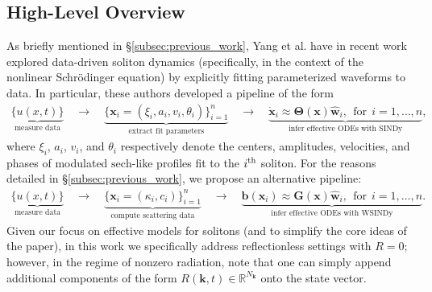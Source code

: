 \documentclass[journal=gmj]{CUP-JNL-DTM}%
\theoremstyle{definition}
\numberwithin{equation}{section}
\begin{document}
\subsection{High-Level Overview}\label{subsec:outline}
As briefly mentioned in \S\ref{subsec:previous_work}, Yang et al. have in recent work \cite{Yang.etal2025} explored data-driven soliton dynamics (specifically, in the context of the nonlinear Schr\"odinger equation) by explicitly fitting parameterized waveforms to data. In particular, these authors developed a pipeline of the form
\begin{align*}
    \underbrace{\big\{ u(x,t) \big\}}_{\text{measure data}}
    \quad \rightarrow \quad
    \underbrace{\big\{ \boldsymbol{x}_i = (\xi_i, a_i, v_i, \theta_i) \big\}_{i=1}^{n}}_{\text{extract fit parameters}}
    \quad \rightarrow \quad
    \underbrace{\dot{\boldsymbol{x}}_i \approx \mathbf{\Theta}(\boldsymbol{x}) \hat{\mathbf{w}}_i, \ \ \text{for} \ \ i = 1, \dots, n}_{\text{infer effective ODEs with SINDy}},
\end{align*} where $\xi_i$, $a_i$, $v_i$, and $\theta_i$ respectively denote the centers, amplitudes, velocities, and phases of modulated $\text{sech}$-like profiles fit to the $i^{\rm{th}}$ soliton. For the reasons detailed in \S\ref{subsec:previous_work}, we propose an alternative pipeline: \begin{align*}
    \underbrace{\big\{ u(x,t) \big\}}_{\text{measure data}}
    \quad \rightarrow \quad
    \underbrace{\big\{ \boldsymbol{x}_i = (\kappa_i, c_i) \big\}_{i=1}^{n}}_{\text{compute scattering data}}
    \quad \rightarrow \quad
    \underbrace{\mathbf{b}(\boldsymbol{x}_i) \approx \mathbf{G}(\boldsymbol{x}) \hat{\mathbf{w}}_i, \ \ \text{for} \ \ i = 1, \dots, n}_{\text{infer effective ODEs with WSINDy}}.
\end{align*} Given our focus on effective models for solitons (and to simplify the core ideas of the paper), in this work we specifically address reflectionless settings with $R = 0$; however, in the regime of nonzero radiation, note that one can simply append additional components of the form $R(\mathbf{k},t) \in \mathbb{R}^{N_{\mathbf{k}}}$ onto the state vector.
\end{document}

